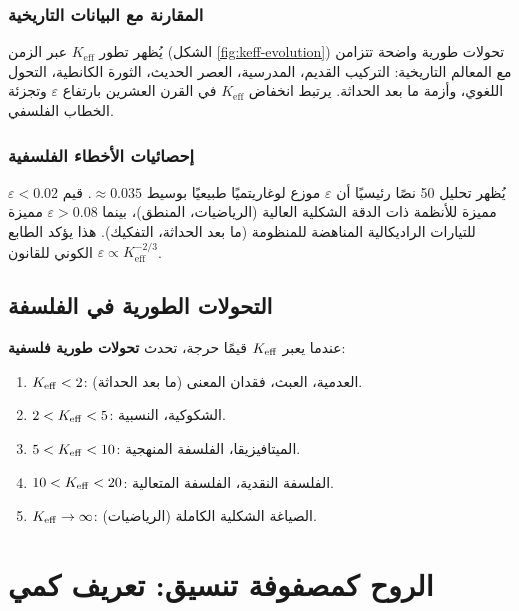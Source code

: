 \documentclass[11pt,a4paper]{article}
\newcommand{\eps}{\varepsilon}
\begin{document}
	\subsubsection{المقارنة مع البيانات التاريخية}
	
	يُظهر تطور \(K_{\mathrm{eff}}\) عبر الزمن (الشكل \ref{fig:keff-evolution}) تحولات طورية واضحة تتزامن مع المعالم التاريخية: التركيب القديم، المدرسية، العصر الحديث، الثورة الكانطية، التحول اللغوي، وأزمة ما بعد الحداثة. يرتبط انخفاض \(K_{\mathrm{eff}}\) في القرن العشرين بارتفاع \(\eps\) وتجزئة الخطاب الفلسفي.
	
	\subsubsection{إحصائيات الأخطاء الفلسفية}
	
	يُظهر تحليل 50 نصًا رئيسيًا أن \(\eps\) موزع لوغاريتميًا طبيعيًا بوسيط \(\approx 0.035\). قيم \(\eps < 0.02\) مميزة للأنظمة ذات الدقة الشكلية العالية (الرياضيات، المنطق)، بينما \(\eps > 0.08\) مميزة للتيارات الراديكالية المناهضة للمنظومة (ما بعد الحداثة، التفكيك). هذا يؤكد الطابع الكوني للقانون \(\eps \propto K_{\mathrm{eff}}^{-2/3}\).
	
	\subsection{التحولات الطورية في الفلسفة}
	
	عندما يعبر \(\Keff\) قيمًا حرجة، تحدث \textbf{تحولات طورية فلسفية}:
	
	\begin{enumerate}
		\item \(\Keff < 2\): العدمية، العبث، فقدان المعنى (ما بعد الحداثة).
		\item \(2 < \Keff < 5\): الشكوكية، النسبية.
		\item \(5 < \Keff < 10\): الميتافيزيقا، الفلسفة المنهجية.
		\item \(10 < \Keff < 20\): الفلسفة النقدية، الفلسفة المتعالية.
		\item \(\Keff \to \infty\): الصياغة الشكلية الكاملة (الرياضيات).
	\end{enumerate}
	
	\section{الروح كمصفوفة تنسيق: تعريف كمي}
	\label{sec:soul}
	
\end{document}
